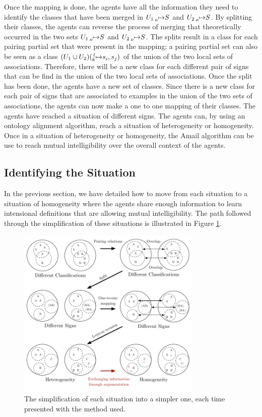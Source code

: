 Once the mapping is done, the agents have all the information they need to identify the classes that have been merged in $U_{1} \prescript{}{o}{\mapsto} S$ and $U_{2} \prescript{}{o}{\mapsto} S$. By splitting their classes, the agents can reverse the process of merging that theoretically occurred in the two sets $U_{1} \prescript{}{o}{\mapsto} S$ and $U_{2} \prescript{}{o}{\mapsto} S$. The splits result in a class for each pairing partial set that were present in the mapping; a pairing partial set can also be seen as a class $(U_{1} \cup U_{2})(\prescript{l}{k}{\mapsto} s_{i},s_{j})$ of the union of the two local sets of associations. Therefore, there will be a new class for each different pair of signs that can be find in the union of the two local sets of associations.
Once the split has been done, the agents have a new set of classes. Since there is a new class for each pair of signs that are associated to examples in the union of the two sets of associations, the agents can now make a one to one mapping of their classes. The agents have reached a situation of different signs. The agents can, by using an ontology alignment algorithm, reach a situation of heterogeneity or homogeneity.
Once in a situation of heterogeneity or homogeneity, the Amail algorithm can be use to reach mutual intelligibility over the overall context of the agents.

\subsection{Identifying the Situation}

In the previous section, we have detailed how to move from each situation to a situation of homogeneity where the agents share enough information to learn intensional definitions that are allowing mutual intelligibility. The path followed through the simplification of these situations is illustrated in Figure \ref{fig:simplification}.

\begin{figure}
    \centering
    \includegraphics[width = 250pt]{figs/situations_simplification.pdf}
    \caption{The simplification of each situation into a simpler one, each time presented with the method used.}
    \label{fig:simplification}
\end{figure}

